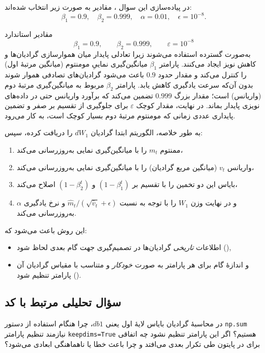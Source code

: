 \documentclass{article}
\begin{document}
در پیاده‌سازی این سوال ، مقادیر به صورت زیر انتخاب شده‌اند:
\[
\beta_1 = 0.9, \quad
\beta_2 = 0.999, \quad
\alpha = 0.01, \quad
\epsilon = 10^{-8}.
\]

مقادیر استاندارد
\[
\beta_{1}=0.9,\qquad \beta_{2}=0.999,\qquad \varepsilon = 10^{-8}
\]
به‌صورت گسترده استفاده می‌شوند زیرا تعادلی پایدار میان هموارسازی گرادیان‌ها و کاهش نویز ایجاد می‌کنند.  
پارامتر $\beta_{1}$ میانگین‌گیری نماییِ مومنتوم (میانگین مرتبهٔ اول) را کنترل می‌کند و مقدار حدود $0.9$ باعث می‌شود گرادیان‌های تصادفی هموار شوند بدون آن‌که سرعت یادگیری کاهش یابد.  
پارامتر $\beta_{2}$ مربوط به میانگین‌گیری مرتبهٔ دوم (واریانس) است؛ مقدار بزرگ $0.999$ تضمین می‌کند که برآورد واریانس حتی در داده‌های نویزی پایدار بماند.  
در نهایت، مقدار کوچک $\varepsilon$ برای جلوگیری از تقسیم بر صفر و تضمین پایداری عددی زمانی که مومنتوم مرتبهٔ دوم بسیار کوچک است، به کار می‌رود.


به طور خلاصه، الگوریتم  ابتدا گرادیان $dW_1$ را دریافت کرده، سپس:
\begin{enumerate}
	\item ممنتوم $m_t$ را با میانگین‌گیری نمایی به‌روزرسانی می‌کند،
	\item واریانس $v_t$ (میانگین مربع گرادیان) را با میانگین‌گیری نمایی به‌روزرسانی می‌کند،
	\item بایاس این دو تخمین را با تقسیم بر $(1-\beta_1^t)$ و $(1-\beta_2^t)$ اصلاح می‌کند،
	\item و در نهایت وزن $W_1$ را با توجه به نسبت $\hat{m}_t / (\sqrt{\hat{v}_t} + \epsilon)$ و نرخ یادگیری $\alpha$ به‌روزرسانی می‌کند.
\end{enumerate}

این روش باعث می‌شود که:
\begin{itemize}
	\item اطلاعات \emph{تاریخی} گرادیان‌ها در تصمیم‌گیری جهت گام بعدی لحاظ شود (),
	\item و اندازهٔ گام برای هر پارامتر به صورت \emph{خودکار} و متناسب با مقیاس گرادیان آن پارامتر تنظیم شود ().
\end{itemize}


\subsection{سؤال تحلیلی مرتبط با کد}

در محاسبهٔ گرادیان بایاس لایهٔ اول یعنی $db1$، چرا هنگام استفاده از دستور
\texttt{np.sum} نیازمند تنظیم پارامتر \texttt{keepdims=True} هستیم؟ اگر این پارامتر تنظیم نشود چه اتفاقی برای  در پایتون طی تکرار بعدی می‌افتد و چرا باعث خطا یا ناهماهنگی ابعادی می‌شود؟
\end{document}
